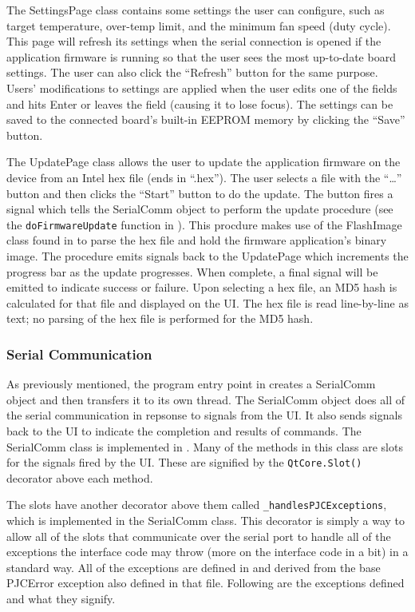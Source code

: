 \documentclass{article}
\begin{document}
The SettingsPage class contains some settings the user can configure, such as target temperature,
over-temp limit, and the minimum fan speed (duty cycle).  This page will refresh its settings when
the serial connection is opened if the application firmware is running so that the user sees the
most up-to-date board settings.  The user can also click the ``Refresh'' button for the same
purpose.  Users' modifications to settings are applied when the user edits one of the fields and
hits Enter or leaves the field (causing it to lose focus).  The settings can be saved to the
connected board's built-in EEPROM memory by clicking the ``Save'' button.

The UpdatePage class allows the user to update the application firmware on the device from an Intel
hex file (ends in ``.hex'').  The user selects a file with the ``\ldots'' button and then clicks the
``Start'' button to do the update.  The button fires a signal which tells the SerialComm object to
perform the update procedure (see the \texttt{doFirmwareUpdate} function in
).  This procdure makes use of the FlashImage class found in
 to parse the hex file and hold the firmware application's binary
image.  The procedure emits signals back to the UpdatePage which increments the progress bar as the
update progresses.  When complete, a final signal will be emitted to indicate success or failure.
Upon selecting a hex file, an MD5 hash is calculated for that file and displayed on the UI.  The hex
file is read line-by-line as text; no parsing of the hex file is performed for the MD5 hash.

\subsubsection{Serial Communication} \label{sssec:SWSerialComm}

As previously mentioned, the program entry point in  creates a SerialComm
object and then transfers it to its own thread.  The SerialComm object does all of the serial
communication in repsonse to signals from the UI.  It also sends signals back to the UI to indicate
the completion and results of commands.  The SerialComm class is implemented in
.  Many of the methods in this class are slots for the signals fired by
the UI.  These are signified by the \texttt{QtCore.Slot()} decorator above each method.

The slots have another decorator above them called \texttt{\_handlesPJCExceptions}, which is
implemented in the SerialComm class.  This decorator is simply a way to allow all of the slots that
communicate over the serial port to handle all of the exceptions the interface code may throw (more
on the interface code in a bit) in a standard way.  All of the exceptions are defined in
 and derived from the base PJCError exception also defined in that file.
Following are the exceptions defined and what they signify.
\end{document}
